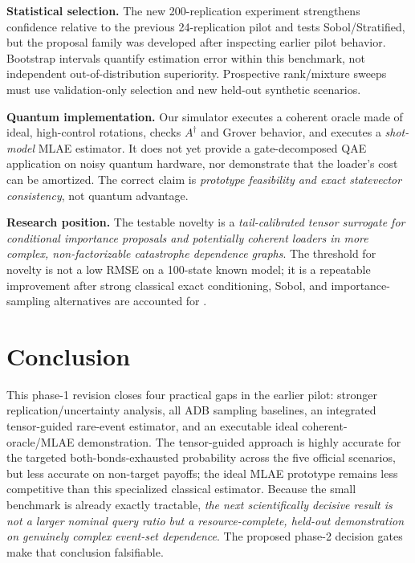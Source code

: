 \documentclass[10pt,conference]{IEEEtran}
\begin{document}
\textbf{Statistical selection.} The new 200-replication experiment strengthens confidence relative to the previous 24-replication pilot and tests Sobol/Stratified, but the proposal family was developed after inspecting earlier pilot behavior. Bootstrap intervals quantify estimation error within this benchmark, not independent out-of-distribution superiority. Prospective rank/mixture sweeps must use validation-only selection and new held-out synthetic scenarios.

\textbf{Quantum implementation.} Our simulator executes a coherent oracle made of ideal, high-control rotations, checks $A^\dagger$ and Grover behavior, and executes a \emph{shot-model} MLAE estimator. It does not yet provide a gate-decomposed QAE application on noisy quantum hardware, nor demonstrate that the loader's cost can be amortized. The correct claim is \emph{prototype feasibility and exact statevector consistency}, not quantum advantage.

\textbf{Research position.} The testable novelty is a \emph{tail-calibrated tensor surrogate for conditional importance proposals and potentially coherent loaders in more complex, non-factorizable catastrophe dependence graphs}. The threshold for novelty is not a low RMSE on a 100-state known model; it is a repeatable improvement after strong classical exact conditioning, Sobol, and importance-sampling alternatives are accounted for \cite{glasserman,han}.

\section{Conclusion}
This phase-1 revision closes four practical gaps in the earlier pilot: stronger replication/uncertainty analysis, all ADB sampling baselines, an integrated tensor-guided rare-event estimator, and an executable ideal coherent-oracle/MLAE demonstration. The tensor-guided approach is highly accurate for the targeted both-bonds-exhausted probability across the five official scenarios, but less accurate on non-target payoffs; the ideal MLAE prototype remains less competitive than this specialized classical estimator. Because the small benchmark is already exactly tractable, \emph{the next scientifically decisive result is not a larger nominal query ratio but a resource-complete, held-out demonstration on genuinely complex event-set dependence}. The proposed phase-2 decision gates make that conclusion falsifiable.
\end{document}
